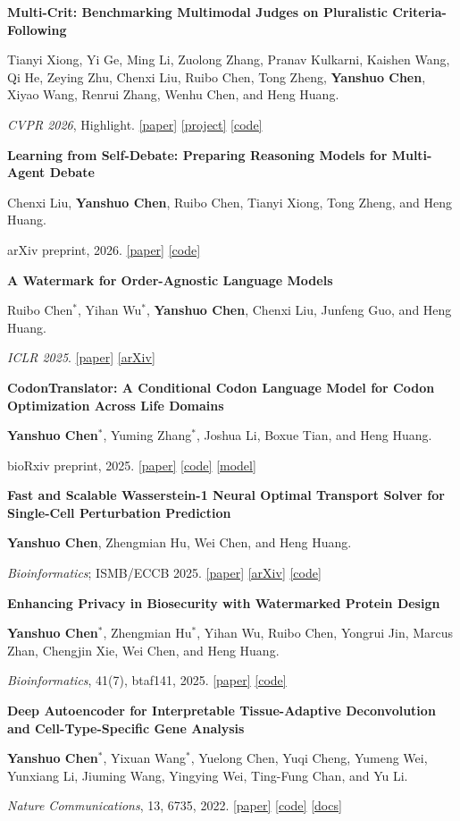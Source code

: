 \documentclass{resume}
\newcommand{\publicationentry}[3]{%
  \par\noindent\begin{minipage}{\linewidth}
    \textbf{#1}\par
    {\fontsize{9}{10.5}\selectfont #2\par}
    {\fontsize{9}{10.5}\selectfont #3\par}
  \end{minipage}\par\vspace{0.25em}
}
\begin{document}
\publicationentry
{Multi-Crit: Benchmarking Multimodal Judges on Pluralistic Criteria-Following}
{Tianyi Xiong, Yi Ge, Ming Li, Zuolong Zhang, Pranav Kulkarni, Kaishen Wang, Qi He, Zeying Zhu, Chenxi Liu, Ruibo Chen, Tong Zheng, \textbf{Yanshuo Chen}, Xiyao Wang, Renrui Zhang, Wenhu Chen, and Heng Huang.}
{\textit{CVPR 2026}, Highlight. \href{https://openaccess.thecvf.com/content/CVPR2026/html/Xiong_Multi-Crit_Benchmarking_Multimodal_Judges_on_Pluralistic_Criteria-Following_CVPR_2026_paper.html}{[paper]} \href{https://multi-crit.github.io/}{[project]} \href{https://github.com/tyxiong23/Multi-Crit}{[code]}}

\publicationentry
{Learning from Self-Debate: Preparing Reasoning Models for Multi-Agent Debate}
{Chenxi Liu, \textbf{Yanshuo Chen}, Ruibo Chen, Tianyi Xiong, Tong Zheng, and Heng Huang.}
{arXiv preprint, 2026. \href{https://www.arxiv.org/abs/2601.22297}{[paper]} \href{https://github.com/DawnLIU35/SDRL}{[code]}}

\publicationentry
{A Watermark for Order-Agnostic Language Models}
{Ruibo Chen$^*$, Yihan Wu$^*$, \textbf{Yanshuo Chen}, Chenxi Liu, Junfeng Guo, and Heng Huang.}
{\textit{ICLR 2025}. \href{https://openreview.net/forum?id=Nlm3Xf0W9S}{[paper]} \href{https://arxiv.org/abs/2410.13805}{[arXiv]}}
\publicationentry
{CodonTranslator: A Conditional Codon Language Model for Codon Optimization Across Life Domains}
{\textbf{Yanshuo Chen$^*$}, Yuming Zhang$^*$, Joshua Li, Boxue Tian, and Heng Huang.}
{bioRxiv preprint, 2025. \href{https://doi.org/10.1101/2025.11.24.690310}{[paper]} \href{https://github.com/poseidonchan/CodonTranslator}{[code]} \href{https://huggingface.co/alegendaryfish/CodonTranslator}{[model]}}

\publicationentry
{Fast and Scalable Wasserstein-1 Neural Optimal Transport Solver for Single-Cell Perturbation Prediction}
{\textbf{Yanshuo Chen}, Zhengmian Hu, Wei Chen, and Heng Huang.}
{\textit{Bioinformatics}; ISMB/ECCB 2025. \href{https://academic.oup.com/bioinformatics/article/41/Supplement_1/i513/8199349}{[paper]} \href{https://arxiv.org/abs/2411.00614}{[arXiv]} \href{https://github.com/poseidonchan/w1ot}{[code]}}

\publicationentry
{Enhancing Privacy in Biosecurity with Watermarked Protein Design}
{\textbf{Yanshuo Chen$^*$}, Zhengmian Hu$^*$, Yihan Wu, Ruibo Chen, Yongrui Jin, Marcus Zhan, Chengjin Xie, Wei Chen, and Heng Huang.}
{\textit{Bioinformatics}, 41(7), btaf141, 2025. \href{https://academic.oup.com/bioinformatics/article/41/7/btaf141/8124073}{[paper]} \href{https://github.com/poseidonchan/ProteinWatermark}{[code]}}

\publicationentry
{Deep Autoencoder for Interpretable Tissue-Adaptive Deconvolution and Cell-Type-Specific Gene Analysis}
{\textbf{Yanshuo Chen$^*$}, Yixuan Wang$^*$, Yuelong Chen, Yuqi Cheng, Yumeng Wei, Yunxiang Li, Jiuming Wang, Yingying Wei, Ting-Fung Chan, and Yu Li.}
{\textit{Nature Communications}, 13, 6735, 2022. \href{https://www.nature.com/articles/s41467-022-34550-9}{[paper]} \href{https://github.com/poseidonchan/TAPE}{[code]} \href{https://sctape.readthedocs.io/}{[docs]}}
\end{document}
